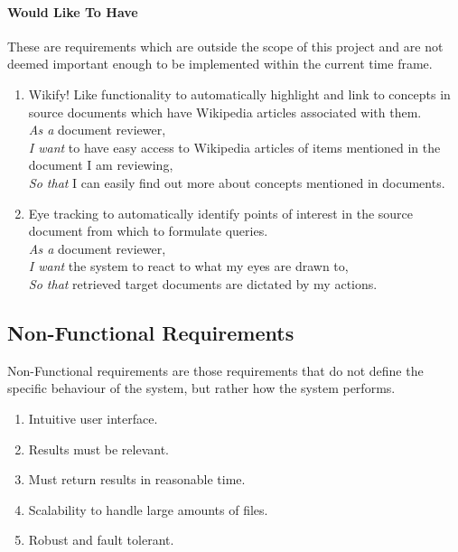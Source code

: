 \documentclass{l4proj}
\begin{document}
\paragraph{Would Like To Have}
These are requirements which are outside the scope of this project and are not deemed important enough to be implemented within the current time frame.
\begin{enumerate}[label=\textbf{W.\arabic*}]
\item Wikify! Like functionality to automatically highlight and link to concepts in source documents which have Wikipedia articles associated with them. \\
\textit{As a} document reviewer, \\
\textit{I want} to have easy access to Wikipedia articles of items mentioned in the document I am reviewing, \\
\textit{So that} I can easily find out more about concepts mentioned in documents.
\item Eye tracking to automatically identify points of interest in the source document from which to formulate queries. \\
\textit{As a} document reviewer, \\
\textit{I want} the system to react to what my eyes are drawn to, \\
\textit{So that} retrieved target documents are dictated by my actions.
\end{enumerate}
\subsection{Non-Functional Requirements}
Non-Functional requirements are those requirements that do not define the specific behaviour of the system, but rather how the system performs.
\begin{enumerate}[label=\textbf{NF.\arabic*}]
\item Intuitive user interface.
\item Results must be relevant.
\item Must return results in reasonable time.
\item Scalability to handle large amounts of files.
\item Robust and fault tolerant.
\end{enumerate}
\end{document}
